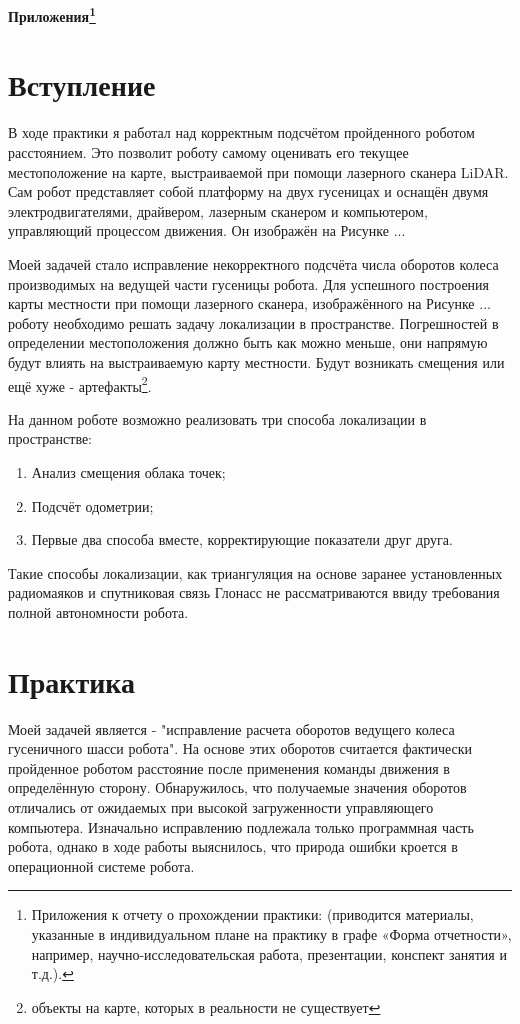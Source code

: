 \documentclass[12pt,a4paper]{scrartcl}
\begin{document}
		\newpage
	
	\begin{center}
		\textbf{Приложения\footnote{Приложения к отчету о прохождении практики: (приводится материалы, указанные в индивидуальном плане на практику в графе «Форма отчетности», например, научно-исследовательская работа, презентации, конспект занятия и т.д.).}}
	\end{center}
		
		\section*{Вступление}
			В ходе практики я работал над корректным подсчётом пройденного роботом расстоянием. Это позволит роботу самому оценивать его текущее местоположение на карте, выстраиваемой при помощи лазерного сканера LiDAR. Сам робот представляет собой платформу на двух гусеницах и оснащён двумя электродвигателями, драйвером, лазерным сканером и компьютером, управляющий процессом движения. Он изображён на Рисунке ...
			
			Моей задачей стало исправление некорректного подсчёта числа оборотов колеса производимых на ведущей части гусеницы робота. Для успешного построения карты местности при помощи лазерного сканера, изображённого на Рисунке ... роботу необходимо решать задачу локализации в пространстве. Погрешностей в определении местоположения должно быть как можно меньше, они напрямую будут влиять на выстраиваемую карту местности. Будут возникать смещения или ещё хуже - артефакты\footnote{объекты на карте, которых в реальности не существует}.
			
			На данном роботе возможно реализовать три способа локализации в пространстве:
			\begin{enumerate}
				\item Анализ смещения облака точек;
				\item Подсчёт одометрии;
				\item Первые два способа вместе, корректирующие показатели друг друга.
			\end{enumerate}
			
			Такие способы локализации, как триангуляция на основе заранее установленных радиомаяков и спутниковая связь Глонасс не рассматриваются ввиду требования полной автономности робота.
			
		\section*{Практика}
			Моей задачей является - "исправление расчета оборотов ведущего колеса гусеничного шасси робота". На основе этих оборотов считается фактически пройденное роботом расстояние после применения команды движения в определённую сторону. Обнаружилось, что получаемые значения оборотов отличались от ожидаемых при высокой загруженности управляющего компьютера. Изначально исправлению подлежала только программная часть робота, однако в ходе работы выяснилось, что природа ошибки кроется в операционной системе робота. 
			
\end{document}
